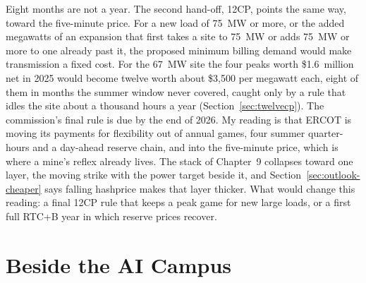 Eight months are not a year. The second hand-off, 12CP, points the same way, toward the five-minute price. For a new load of 75~MW or more, or the added megawatts of an expansion that first takes a site to 75~MW or adds 75~MW or more to one already past it, the proposed minimum billing demand would make transmission a fixed cost. For the 67~MW site the four peaks worth \$1.6~million net in 2025 would become twelve worth about \$3,500 per megawatt each, eight of them in months the summer window never covered, caught only by a rule that idles the site about a thousand hours a year (Section~\ref{sec:twelvecp}). The commission's final rule is due by the end of 2026. %
My reading is that ERCOT is moving its payments for flexibility out of annual games, four summer quarter-hours and a day-ahead reserve chain, and into the five-minute price, which is where a mine's reflex already lives. The stack of Chapter~9 collapses toward one layer, the moving strike with the power target beside it, and Section~\ref{sec:outlook-cheaper} says falling hashprice makes that layer thicker. What would change this reading: a final 12CP rule that keeps a peak game for new large loads, or a first full RTC+B year in which reserve prices recover.

\section{Beside the AI Campus}
\label{sec:outlook-ai}

